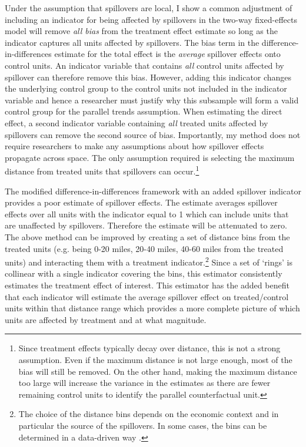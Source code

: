 \documentclass[11pt]{article}
\begin{document}
Under the assumption that spillovers are local, I show a common adjustment of including an indicator for being affected by spillovers in the two-way fixed-effects model will remove \emph{all bias} from the treatment effect estimate so long as the indicator captures all units affected by spillovers. The bias term in the difference-in-differences estimate for the total effect is the \textit{average} spillover effects onto control units. An indicator variable that contains \emph{all} control units affected by spillover can therefore remove this bias. However, adding this indicator changes the underlying control group to the control units not included in the indicator variable and hence a researcher must justify why this subsample will form a valid control group for the parallel trends assumption. When estimating the direct effect, a second indicator variable containing \emph{all} treated units affected by spillovers can remove the second source of bias. Importantly, my method does not require researchers to make any assumptions about how spillover effects propagate across space. The only assumption required is selecting the maximum distance from treated units that spillovers can occur.\footnote{Since treatment effects typically decay over distance, this is not a strong assumption. Even if the maximum distance is not large enough, most of the bias will still be removed. On the other hand, making the maximum distance too large will increase the variance in the estimates as there are fewer remaining control units to identify the parallel counterfactual unit.} 

The modified difference-in-differences framework with an added spillover indicator provides a poor estimate of spillover effects. The estimate averages spillover effects over all units with the indicator equal to 1 which can include units that are unaffected by spillovers. Therefore the estimate will be attenuated to zero. The above method can be improved by creating a set of distance bins from the treated units (e.g. being 0-20 miles, 20-40 miles, 40-60 miles from the treated units) and interacting them with a treatment indicator.\footnote{The choice of the distance bins depends on the economic context and in particular the source of the spillovers. In some cases, the bins can be determined in a data-driven way \citep{Butts_2021}.} Since a set of `rings' is collinear with a single indicator covering the bins, this estimator consistently estimates the treatment effect of interest. This estimator has the added benefit that each indicator will estimate the average spillover effect on treated/control units within that distance range which provides a more complete picture of which units are affected by treatment and at what magnitude. 
\end{document}
